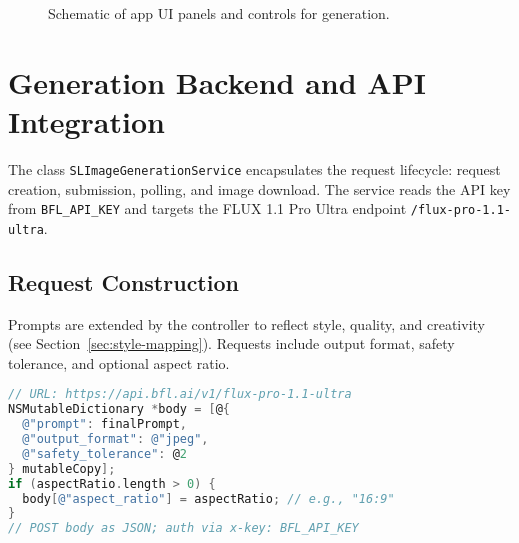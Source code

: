 \begin{figure}[H]
\centering
{}
\caption{Schematic of app UI panels and controls for generation.}
\label{fig:ui-layout}
\end{figure}

\section{Generation Backend and API Integration}
The class \texttt{SLImageGenerationService} encapsulates the request lifecycle: request creation, submission, polling, and image download. The service reads the API key from \texttt{BFL\_API\_KEY} and targets the FLUX 1.1 Pro Ultra endpoint \texttt{/flux-pro-1.1-ultra}.

\subsection{Request Construction}
Prompts are extended by the controller to reflect style, quality, and creativity (see Section~\ref{sec:style-mapping}). Requests include output format, safety tolerance, and optional aspect ratio.

\begin{lstlisting}[language=C, basicstyle=\ttfamily\small, caption={Core generation request (abridged).}, label={lst:request}]
// URL: https://api.bfl.ai/v1/flux-pro-1.1-ultra
NSMutableDictionary *body = [@{
  @"prompt": finalPrompt,
  @"output_format": @"jpeg",
  @"safety_tolerance": @2
} mutableCopy];
if (aspectRatio.length > 0) {
  body[@"aspect_ratio"] = aspectRatio; // e.g., "16:9"
}
// POST body as JSON; auth via x-key: BFL_API_KEY
\end{lstlisting}

